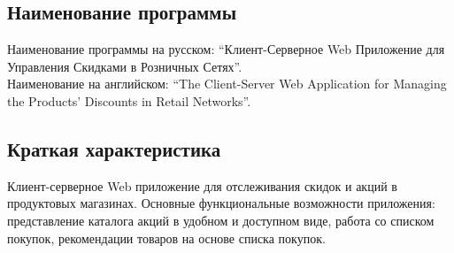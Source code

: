 \subsection{Наименование программы}
Наименование программы на русском: 
``Клиент-Серверное Web Приложение для Управления Скидками в Розничных Сетях''.  \\
Наименование на английском: 
``The Client-Server Web Application for Managing the Products' Discounts in
Retail Networks''. \\


\subsection{Краткая характеристика}
Клиент-серверное Web приложение для отслеживания скидок и акций в продуктовых
магазинах. Основные функциональные возможности приложения: представление
каталога акций в удобном и доступном виде, работа со списком покупок,
рекомендации товаров на основе списка покупок.

